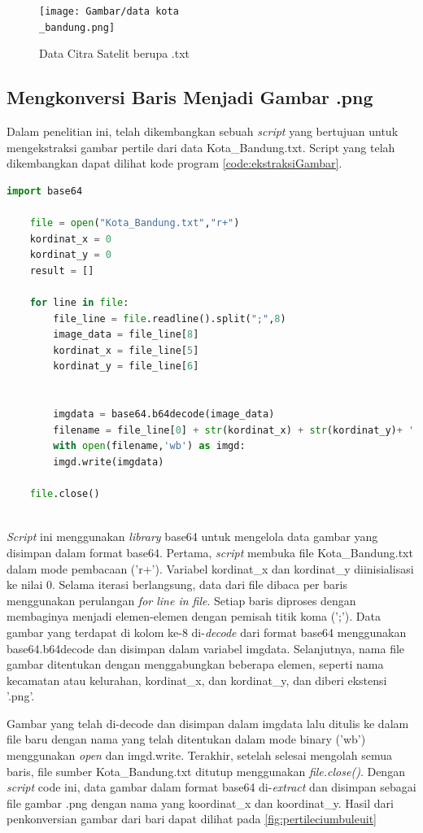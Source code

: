 \begin{figure}[H]
	\centering
	\texttt{[image: Gambar/data kota\\\_bandung.png]}
	\caption{Data Citra Satelit berupa .txt}
	\label{fig:kotabandungteks}
\end{figure} 

\subsection{Mengkonversi Baris Menjadi Gambar .png}
Dalam penelitian ini, telah dikembangkan sebuah \textit{script} yang bertujuan untuk mengekstraksi gambar pertile dari data Kota\_Bandung.txt. Script yang telah dikembangkan dapat dilihat kode program \ref{code:ekstraksiGambar}.

\begin{lstlisting}[language=Python, caption=Script Mengekstrasi gambar per tile,label={code:ekstraksiGambar}]
	import base64
	
	file = open("Kota_Bandung.txt","r+")
	kordinat_x = 0
	kordinat_y = 0
	result = []
	
	for line in file:
		file_line = file.readline().split(";",8)   
		image_data = file_line[8]
		kordinat_x = file_line[5]
		kordinat_y = file_line[6]
		
		
		imgdata = base64.b64decode(image_data)
		filename = file_line[0] + str(kordinat_x) + str(kordinat_y)+ '.png'
		with open(filename,'wb') as imgd:
		imgd.write(imgdata)
	
	file.close()
		
\end{lstlisting}

\textit{Script }ini menggunakan \textit{library} base64 untuk mengelola data gambar yang disimpan dalam format base64. Pertama, \textit{script} membuka file Kota\_Bandung.txt dalam mode pembacaan ('r+'). Variabel kordinat\_x dan kordinat\_y diinisialisasi ke nilai 0. Selama iterasi berlangsung, data dari file dibaca per baris menggunakan perulangan \textit{for line in file}. Setiap baris diproses dengan membaginya menjadi elemen-elemen dengan pemisah titik koma (';'). Data gambar yang terdapat di kolom ke-8 di-\textit{decode} dari format base64 menggunakan base64.b64decode dan disimpan dalam variabel imgdata. Selanjutnya, nama file gambar ditentukan dengan menggabungkan beberapa elemen, seperti nama kecamatan atau kelurahan, kordinat\_x, dan kordinat\_y, dan diberi ekstensi '.png'.

Gambar yang telah di-decode dan disimpan dalam imgdata lalu ditulis ke dalam file baru dengan nama yang telah ditentukan dalam mode binary ('wb') menggunakan \textit{open} dan imgd.write. Terakhir, setelah selesai mengolah semua baris, file sumber Kota\_Bandung.txt ditutup menggunakan \textit{file.close()}. Dengan \textit{script} code ini, data gambar dalam format base64 di-\textit{extract} dan disimpan sebagai file gambar .png dengan nama yang koordinat\_x dan koordinat\_y. Hasil dari penkonversian gambar dari bari dapat dilihat pada \ref{fig:pertileciumbuleuit}

